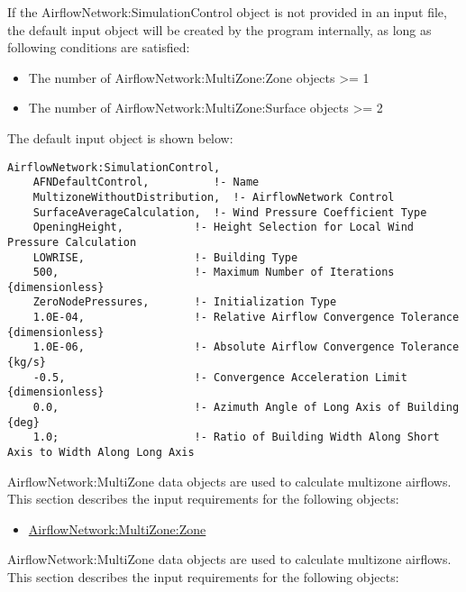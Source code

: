 If the AirflowNetwork:SimulationControl object is not provided in an input file, the default input object will be created by the program internally, as long as following conditions are satisfied:
\begin{itemize}
\item The number of AirflowNetwork:MultiZone:Zone objects >= 1
\item The number of AirflowNetwork:MultiZone:Surface objects >= 2
\end{itemize}
The default input object is shown below:

\begin{lstlisting}
AirflowNetwork:SimulationControl,
    AFNDefaultControl,          !- Name
    MultizoneWithoutDistribution,  !- AirflowNetwork Control
    SurfaceAverageCalculation,  !- Wind Pressure Coefficient Type
    OpeningHeight,           !- Height Selection for Local Wind Pressure Calculation
    LOWRISE,                 !- Building Type
    500,                     !- Maximum Number of Iterations {dimensionless}
    ZeroNodePressures,       !- Initialization Type
    1.0E-04,                 !- Relative Airflow Convergence Tolerance {dimensionless}
    1.0E-06,                 !- Absolute Airflow Convergence Tolerance {kg/s}
    -0.5,                    !- Convergence Acceleration Limit {dimensionless}
    0.0,                     !- Azimuth Angle of Long Axis of Building {deg}
    1.0;                     !- Ratio of Building Width Along Short Axis to Width Along Long Axis
\end{lstlisting}

AirflowNetwork:MultiZone data objects are used to calculate multizone airflows. This section describes the input requirements for the following objects:

\begin{itemize}
\tightlist
\item
  \hyperref[airflownetworkmultizonezone]{AirflowNetwork:MultiZone:Zone}
\end{itemize}

AirflowNetwork:MultiZone data objects are used to calculate multizone airflows. This section describes the input requirements for the following objects:

